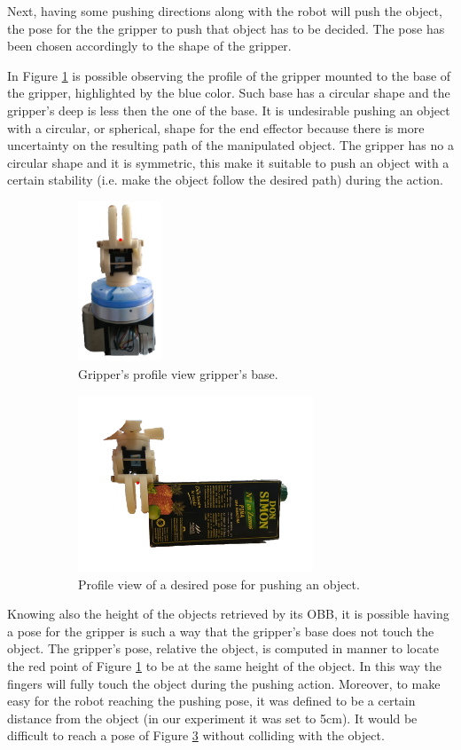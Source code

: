 Next, having some pushing directions along with the robot will push the object, the pose for the the gripper to push that object has to be decided. The pose has been chosen accordingly to the shape of the gripper.

In Figure \ref{fig:gripper_side}
is possible observing the profile of the gripper mounted to the base of the gripper, highlighted by the blue color. Such base has a circular shape and the gripper's deep is less then the one of the base. It is undesirable pushing an object with a circular, or spherical, shape for the end effector because there is more uncertainty on the resulting path of the manipulated object. The gripper has no a circular shape and it is symmetric, this make it suitable to push an object with a certain stability (i.e. make the object follow the desired path) during the action. 
\begin{figure}[tb]
\begin{subfigure}[t]{0.25\textwidth}
\centering
\includegraphics[width=2.5cm]{Img/set_up/gripper_side2.png}
\caption{Gripper's profile view gripper's base.}\label{fig:gripper_side}
\end{subfigure}
\begin{subfigure}[t]{0.7\textwidth}
\centering
\includegraphics[width=7cm]{Img/pushing/pushing1.png}
\caption{Profile view of a desired pose for pushing an object.}\label{fig:pushing_pose}
\end{subfigure}
\caption{}
\end{figure}
Knowing also the height of the objects retrieved by its OBB, it is possible having a pose for the gripper is such a way that the gripper's base does not touch the object. The gripper's pose, relative the object, is computed in manner to locate the red point of Figure \ref{fig:gripper_side} to be at the same height of the object. In this way the fingers will fully touch the object during the pushing action. Moreover, to make easy for the robot reaching the pushing pose, it was defined to be a certain distance from the object (in our experiment it was set to 5cm). It would be difficult to reach a pose of Figure \ref{fig:pushing_pose} without colliding with the object.  

